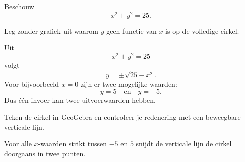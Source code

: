 \documentclass{ximera}
\begin{document}
\begin{oefening}{\oefU\ESS}

Beschouw
\[
x^2+y^2=25.
\]

\begin{question}
Leg zonder grafiek uit waarom \(y\) geen functie van \(x\) is op de volledige cirkel.

\begin{oplossing}
Uit
\[
x^2+y^2=25
\]
volgt
\[
y=\pm\sqrt{25-x^2}.
\]
Voor bijvoorbeeld \(x=0\) zijn er twee mogelijke waarden:
\[
y=5\quad\text{en}\quad y=-5.
\]
Dus één invoer kan twee uitvoerwaarden hebben.
\end{oplossing}
\end{question}

\begin{question}
Teken de cirkel in GeoGebra en controleer je redenering met een beweegbare verticale lijn.

\begin{oplossing}
Voor alle \(x\)-waarden strikt tussen \(-5\) en \(5\) snijdt de verticale lijn
de cirkel doorgaans in twee punten.
\end{oplossing}
\end{question}

\end{oefening}

\end{document}
